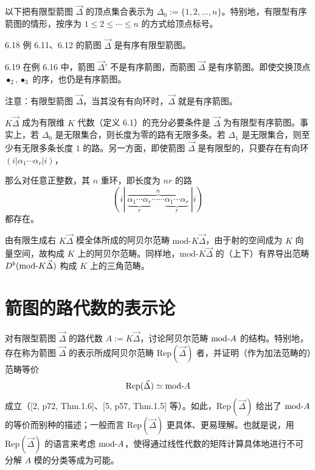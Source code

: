 以下把有限型箭图 $\vec{\Delta}$ 的顶点集合表示为 $\Delta_0:=\{1,2,\dots,n\}$。特别地，有限型有序箭图的情形，按序为 $1\le 2\le\cdots\le n$ 的方式给顶点标号。

\begin{example}{6.18}
例 6.11、6.12 的箭图 $\vec{\Delta}$ 是有序有限型箭图。
\end{example}

\begin{example}{6.19}
在例 6.16 中，箭图 $\vec{\Delta}'$ 不是有序箭图，而箭图 $\vec{\Delta}$ 是有序箭图。即使交换顶点 $\bullet_2,\bullet_3$ 的序，也仍是有序箭图。
\end{example}

注意：有限型箭图 $\vec{\Delta}$，当其没有有向环时，$\vec{\Delta}$ 就是有序箭图。

$K\vec{\Delta}$ 成为有限维 $K$ 代数（定义 6.1）的充分必要条件是 $\vec{\Delta}$ 为有限型有序箭图。事实上，若 $\Delta_0$ 是无限集合，则长度为零的路有无限多条。若 $\Delta_1$ 是无限集合，则至少有无限多条长度 $1$ 的路。另一方面，即使箭图 $\vec{\Delta}$ 是有限型的，只要存在有向环 $(i|\alpha_1\cdots\alpha_r|i)$，

那么对任意正整数，其 $n$ 重环，即长度为 $nr$ 的路
\[
(i|\ \overbrace{\underbrace{\alpha_1\cdots\alpha_r}_{r}\cdots\cdots\underbrace{\alpha_1\cdots\alpha_r}_{r}}^{n}\ |i)
\]
都存在。

由有限生成右 $K\vec{\Delta}$ 模全体所成的阿贝尔范畴 $\mathrm{mod}\text{-}K\vec{\Delta}$，由于射的空间成为 $K$ 向量空间，故构成 $K$ 上的阿贝尔范畴。同样地，$\mathrm{mod}\text{-}K\vec{\Delta}$ 的（上下）有界导出范畴 $D^{b}(\mathrm{mod}\text{-}K\vec{\Delta})$ 构成 $K$ 上的三角范畴。


\section{箭图的路代数的表示论}

对有限型箭图 $\vec{\Delta}$ 的路代数 $A:=K\vec{\Delta}$，讨论阿贝尔范畴 $\mathrm{mod}\text{-}A$ 的结构。特别地，存在称为箭图 $\vec{\Delta}$ 的表示所成阿贝尔范畴 $\mathrm{Rep}(\vec{\Delta})$ 者，并证明（作为加法范畴的）范畴等价
\[
\mathrm{Rep}(\vec{\Delta})\simeq\mathrm{mod}\text{-}A
\]
成立（[2, p72, Thm.1.6]、[5, p57, Thm.1.5] 等）。如此，$\mathrm{Rep}(\vec{\Delta})$ 给出了 $\mathrm{mod}\text{-}A$ 的等价而别种的描述；一般而言 $\mathrm{Rep}(\vec{\Delta})$ 更具体、更易理解。也就是说，用 $\mathrm{Rep}(\vec{\Delta})$ 的语言来考虑 $\mathrm{mod}\text{-}A$，使得通过线性代数的矩阵计算具体地进行不可分解 $A$ 模的分类等成为可能。

